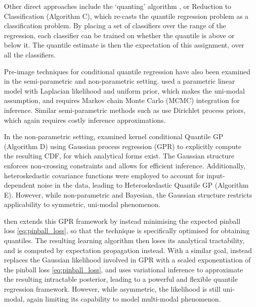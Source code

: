 \documentclass[twoside]{article} \usepackage{aistats2017}
\theoremstyle{definition}
\theoremstyle{theorem}
\begin{document}
	Other direct approaches include the `quanting' algorithm \citep{langford2012predicting}, or Reduction to Classification (Algorithm C), which re-casts the quantile regression problem as a classification problem. By placing a set of classifiers over the range of the regression, each classifier can be trained on whether the quantile is above or below it. The quantile estimate is then the expectation of this assignment, over all the classifiers.

	Pre-image techniques for conditional quantile regression have also been examined in the semi-parametric and non-parametric setting. \cite{yu2001bayesian} used a parametric linear model with Laplacian likelihood and uniform prior, which makes the uni-modal assumption, and requires Markov chain Monte Carlo (MCMC) integration for inference. Similar semi-parametric methods such as \cite{hjort2007nonparametric, hjort2009quantile} use Dirichlet process priors, which again requires costly inference approximations.
	
	In the non-parametric setting, \cite{quadrianto2009kernel} examined kernel conditional Quantile GP (Algorithm D) using Gaussian process regression (GPR) to explicitly compute the resulting CDF, for which analytical forms exist. The Gaussian structure enforces non-crossing constraints and allows for efficient inference. Additionally, heteroskedastic covariance functions were employed to account for input-dependent noise in the data, leading to Heteroskedastic Quantile GP (Algorithm E). However, while non-parametric and Bayesian, the Gaussian structure restricts applicability to symmetric, uni-modal phenomenon.
	
	\cite{boukouvalas2012gaussian} then extends this GPR framework by instead minimising the expected pinball loss \eqref{eq:pinball_loss}, so that the technique is specifically optimised for obtaining quantiles. The resulting learning algorithm then loses its analytical tractability, and is computed by expectation propagation instead. With a similar goal, \cite{abeywardana2015variational} instead replaces the Gaussian likelihood involved in GPR with a scaled exponentiation of the pinball loss \eqref{eq:pinball_loss}, and uses variational inference to approximate the resulting intractable posterior, leading to a powerful and flexible quantile regression framework. However, while asymmetric, the likelihood is still uni-modal, again limiting its capability to model multi-modal phenomenon.
	 
	
\end{document}
